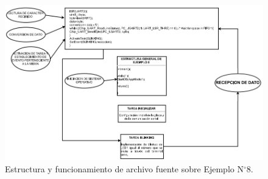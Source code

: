 \documentclass[12pt,letterpaper]{article}
\begin{document}
\begin{figure}[H]
\centering
\includegraphics[width=15 cm]{figuras/f39.png}
\caption{Estructura y funcionamiento de archivo fuente sobre Ejemplo N$^{\circ}$8.}
\label{Fig46}
\end{figure}
\end{document}

